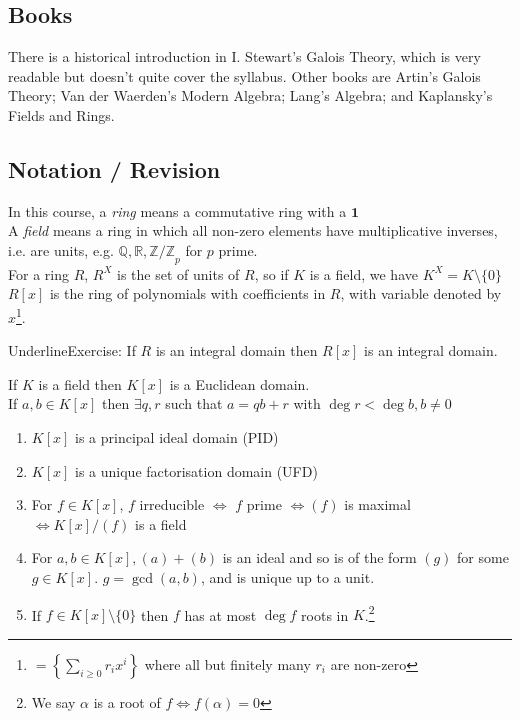 \documentclass[10pt,a4paper]{article}
\begin{document}
\subsection*{Books}
There is a historical introduction in I. Stewart's Galois Theory, which is very readable but doesn't quite cover the syllabus. Other books are Artin's Galois Theory; Van der Waerden's Modern Algebra; Lang's Algebra; and Kaplansky's Fields and Rings.

\subsection*{Notation / Revision}
In this course, a \emph{ring} means a commutative ring with a $\mathbf{1}$\\
A \emph{field} means a ring in which all non-zero elements have multiplicative inverses, i.e. are units, e.g. $\mathbb{Q, R, Z/Z}_p$ for $p$ prime.\\
For a ring $R$, $R^{X}$ is the set of units of $R$, so if $K$ is a field, we have $K^{X} = K\setminus\{0\}$\\
$R[x]$ is the ring of polynomials with coefficients in $R$, with variable denoted by $x$\footnote{$ = \left\{ \sum_{i\geq 0} r_i x^i\right\}$ where all but finitely many $r_i$ are non-zero}.

Underline{Exercise:} If $R$ is an integral domain then $R[x]$ is an integral domain.

If $K$ is a field then $K[x]$ is a Euclidean domain.\\
If $a,b \in K[x]$ then $\exists q,r$ such that $a = qb + r$ with $\deg r < \deg b, b \neq 0$

\begin{corollary}
\item
\begin{enumerate}
\item $K[x]$ is a principal ideal domain (PID)
\item $K[x]$ is a unique factorisation domain (UFD)
\item For $f \in K[x]$, $f$ irreducible $\iff$ $f$ prime $\iff (f)$ is maximal $\iff K[x]/(f)$ is a field
\item For $a, b \in K[x], (a)+(b)$ is an ideal and so is of the form $(g)$ for some $g \in K[x]$. $g = \gcd(a,b)$, and is unique up to a unit.
\item If $f\in K[x]\setminus\{0\}$ then $f$ has at most $\deg f$ roots in $K$.\footnote{We say $\alpha$ is a root of $f \iff f(\alpha) = 0$}
\end{enumerate}
\end{corollary}
\end{document}
